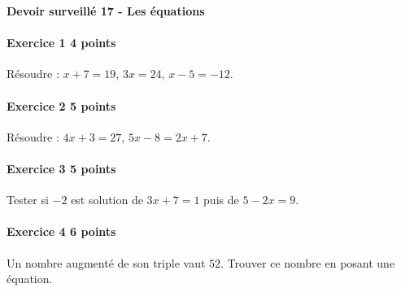 \documentclass[a4paper,10pt]{article}
\newenvironment{exercice}[2]{\paragraph{Exercice #1 \hfill #2 points}\mbox{}\par}{\medskip}
\begin{document}
\begin{center}\Large\bfseries Devoir surveillé 17 - Les équations\end{center}
\vspace{2mm}
\begin{exercice}{1}{4}Résoudre : $x+7=19$, $3x=24$, $x-5=-12$.\end{exercice}\begin{exercice}{2}{5}Résoudre : $4x+3=27$, $5x-8=2x+7$.\end{exercice}\begin{exercice}{3}{5}Tester si $-2$ est solution de $3x+7=1$ puis de $5-2x=9$.\end{exercice}\begin{exercice}{4}{6}Un nombre augmenté de son triple vaut $52$. Trouver ce nombre en posant une équation.\end{exercice}
\end{document}
